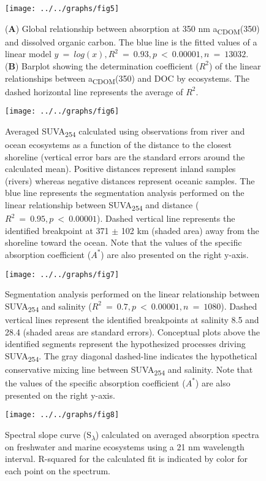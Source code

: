 \documentclass[12pt,a4paper]{scrartcl}
\begin{document}
\clearpage
\newpage

\begin{figure}[h]
	\centering
	\texttt{[image: ../../graphs/fig5]}
	\caption{(\textbf{A}) Global relationship between absorption at 350 nm a\textsubscript{CDOM}(350) and dissolved organic carbon. The blue line is the fitted values of a linear model $y~=~log(x), R^2~=~0.93, p~<~0.00001, n~=~13032$. (\textbf{B}) Barplot showing the determination coefficient ($R^2$) of the linear relationships between a\textsubscript{CDOM}(350) and DOC by ecosystems. The dashed horizontal line represents the average of $R^2$.}
\end{figure}

\clearpage
\newpage

\begin{figure}[h]
	\centering
	\texttt{[image: ../../graphs/fig6]}
	\caption{Averaged SUVA\textsubscript{254} calculated using observations from river and ocean ecosystems as a function of the distance to the closest shoreline (vertical error bars are the standard errors around the calculated mean). Positive distances represent inland samples (rivers) whereas negative distances represent oceanic samples. The blue line represents the segmentation analysis performed on the linear relationship between SUVA\textsubscript{254} and distance ($R^2~=~0.95, p~<~0.00001$). Dashed vertical line represents the identified breakpoint at 371 $\pm$ 102 km (shaded area) away from the shoreline toward the ocean.  Note that the values of the specific absorption coefficient ($A^*$) are also presented on the right y-axis.}

\end{figure}

\clearpage
\newpage

\begin{figure}[h]
	\centering
	\texttt{[image: ../../graphs/fig7]}
	\caption{Segmentation analysis performed on the linear relationship between SUVA\textsubscript{254} and salinity ($R^2~=~0.7, p~<~0.00001, n~=~1080$). Dashed vertical lines represent the identified breakpoints at salinity 8.5 and 28.4 (shaded areas are standard errors). Conceptual plots above the identified segments represent the hypothesized processes driving SUVA\textsubscript{254}. The gray diagonal dashed-line indicates the hypothetical conservative mixing line between SUVA\textsubscript{254} and salinity.  Note that the values of the specific absorption coefficient ($A^*$) are also presented on the right y-axis.}
\end{figure}

\clearpage
\newpage

\begin{figure}[h]
	\centering
	\texttt{[image: ../../graphs/fig8]}
	\caption{Spectral slope curve (S\textsubscript{$\lambda$}) calculated on averaged absorption spectra on freshwater and marine ecosystems using a 21 nm wavelength interval. R-squared for the calculated fit is indicated by color for each point on the spectrum.}
\end{figure}
\end{document}
